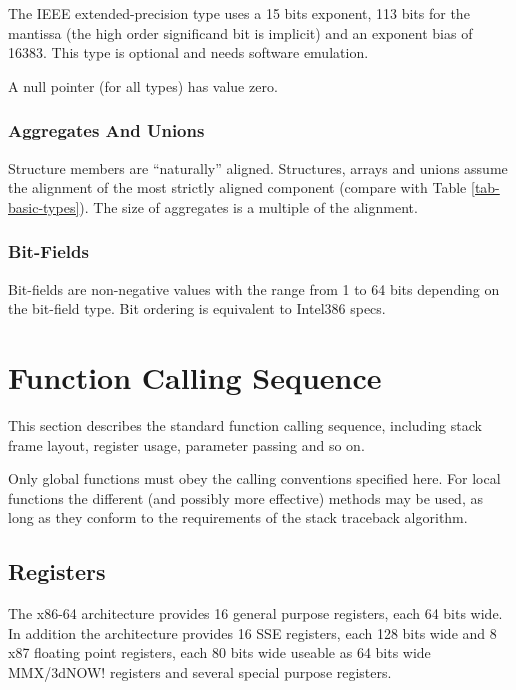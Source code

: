 The IEEE extended-precision type uses a 15 bits exponent, 113 bits for
the mantissa (the high order significand bit is implicit) and an
exponent bias of 16383.  This type is optional and needs software
emulation.

A null pointer (for all types) has value zero.

\subsubsection{Aggregates And Unions}

Structure members are ``naturally'' aligned.  Structures, arrays and
unions assume the alignment of the most strictly aligned component
(compare with Table \ref{tab-basic-types}). The size of aggregates is
a multiple of the alignment.

\subsubsection{Bit-Fields}

Bit-fields are non-negative values with the range from 1 to 64 bits
depending on the bit-field type. Bit ordering is equivalent to
Intel386 specs.



\section{Function Calling Sequence}

This section describes the standard function calling sequence,
including stack frame layout, register usage, parameter passing and so
on.

Only global functions must obey the calling conventions specified
here.  For local functions the different (and possibly more effective)
methods may be used, as long as they conform to the requirements of the
stack traceback algorithm.

\subsection{Registers}
\label{subsec-registers}

The x86-64 architecture provides 16 general purpose registers, each 64
bits wide. In addition the architecture provides 16 SSE registers,
each 128 bits wide and 8 x87 floating point registers, each 80 bits
wide useable as 64 bits wide MMX/3dNOW! registers and several special
purpose registers.

